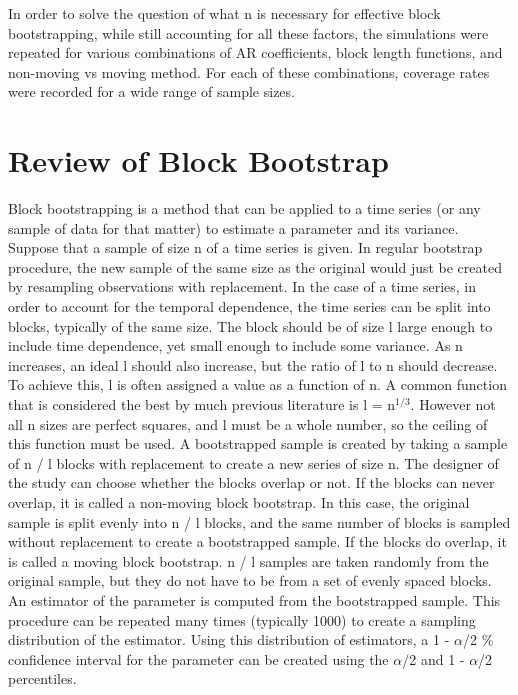\documentclass[12pt, letterpaper, titlepage]{article}
\begin{document}
In order to solve the question of what n is necessary for effective block bootstrapping,
while still accounting for all these factors, the simulations were repeated for
various combinations of AR coefficients, block length functions, and non-moving vs moving method. For each of these combinations, coverage rates were recorded for a wide range of sample sizes.

\section{Review of Block Bootstrap}
\label{sec:blkbootreview}

Block bootstrapping is a method that can be applied to a time series (or any sample of data for that matter) to estimate a parameter and its variance. Suppose that a sample of size n of a time series is given. In regular bootstrap procedure, the new sample of the same size as the original would just be created by resampling observations with replacement. In the case of a time series, in order to account for the temporal dependence, the time series can be split into blocks, typically of the same size. The block should be of size l large enough to include time dependence, yet small enough to include some variance. As n increases, an ideal l should also increase, but the ratio of l to n should decrease. To achieve this, l is often assigned a value as a function of n. A common function that is considered the best by much previous literature is l = n$^{1/3}$. However not all n sizes are perfect squares, and l must be a whole number, so the ceiling of this function must be used. A bootstrapped sample is created by taking a sample of n / l blocks with replacement to create a new series of size n. The designer of the study can choose whether the blocks overlap or not. If the blocks can never overlap, it is called a non-moving block bootstrap. In this case, the original sample is split evenly into n / l blocks, and the same number of blocks is sampled without replacement to create a bootstrapped sample. If the blocks do overlap, it is called a moving block bootstrap. n / l samples are taken randomly from the original sample, but they do not have to be from a set of evenly spaced blocks. An estimator of the parameter is computed from the bootstrapped sample. This procedure can be repeated many times (typically 1000) to create a sampling distribution of the estimator. Using this distribution of estimators, a 1 - $\alpha$/2 \% confidence interval for the parameter can be created using the $\alpha$/2 and 1 - $\alpha$/2 percentiles.
\end{document}
